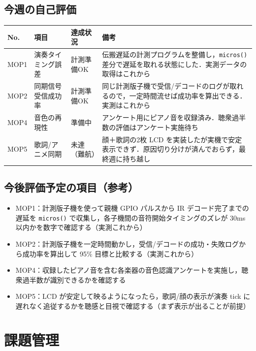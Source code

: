 \documentclass[a4paper,11pt]{ltjsarticle}
\providecommand{\％}{\%}
\begin{document}
\subsection{今週の自己評価}\label{sec:selfeval}

\begingroup
\setlength{\tabcolsep}{3pt}
\sloppy
\begin{longtable}{|p{1.0cm}|p{2.8cm}|p{1.8cm}|p{8.7cm}|}
\hline
\rowcolor[gray]{0.9}
No. & 項目 & 達成状況 & 備考 \\
\hline
MOP1 & 演奏タイミング誤差 & 計測準備OK & 伝搬遅延の計測プログラムを整備し，\texttt{micros()} 差分で遅延を取れる状態にした．実測データの取得はこれから \\
\hline
MOP2 & 同期信号受信成功率 & 計測準備OK & 同じ計測版子機で受信/デコードのログが取れるので，一定時間流せば成功率を算出できる．実測はこれから \\
\hline
MOP4 & 音色の再現性 & 準備中 & アンケート用にピアノ音を収録済み．聴衆過半数の評価はアンケート実施待ち \\
\hline
MOP5 & 歌詞/アニメ同期 & 未達（難航） & 顔＋歌詞の2枚 LCD を実装したが実機で安定表示できず．原因切り分けが済んでおらず，最終週に持ち越し \\
\hline
\end{longtable}
\endgroup

\subsection{今後評価予定の項目（参考）}\label{sec:futureplan}

\begin{itemize}
    \item MOP1：計測版子機を使って親機 GPIO パルスから IR デコード完了までの遅延を \texttt{micros()} で収集し，各子機間の音符開始タイミングのズレが 30ms 以内かを数字で確認する（実測これから）
    \item MOP2：計測版子機を一定時間動かし，受信/デコードの成功・失敗ログから成功率を算出して 95\% 目標と比較する（実測これから）
    \item MOP4：収録したピアノ音を含む各楽器の音色認識アンケートを実施し，聴衆過半数が識別できるかを確認する
    \item MOP5：LCD が安定して映るようになったら，歌詞/顔の表示が演奏 tick に遅れなく追従するかを聴感と目視で確認する（まず表示が出ることが前提）
\end{itemize}

\section{課題管理}\label{sec:issues}
\end{document}
